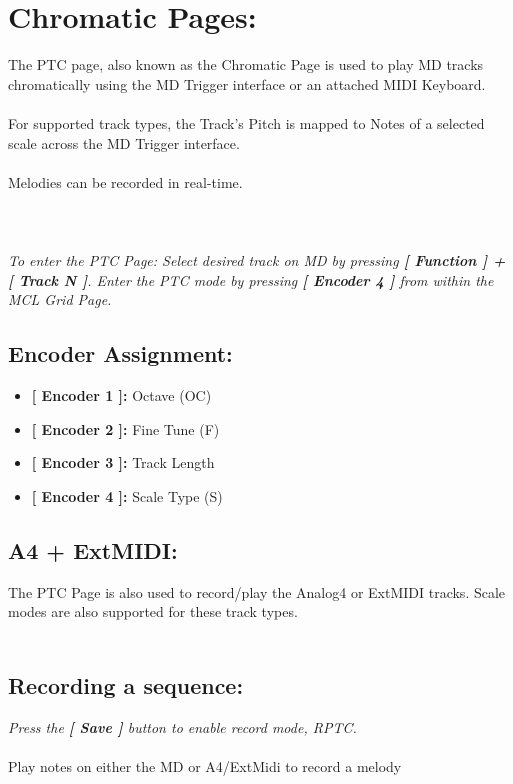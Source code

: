\chapter{Chromatic Pages:}
The PTC page, also known as the  Chromatic Page is used to play MD tracks chromatically using the MD Trigger interface or an attached MIDI Keyboard.\\
\\For supported track types, the Track’s Pitch is mapped to Notes of a selected scale across the MD Trigger interface.\\
\\Melodies can be recorded in real-time.\\
\\
\\\\
\textit{To enter the PTC Page: Select desired track on MD by pressing \textbf{[ Function ] + [ Track N ]}. Enter the PTC mode by pressing \textbf{[ Encoder 4 ] }from within the MCL Grid Page.}
\section{Encoder Assignment:}

	\begin{itemize}
		\item \textbf{[ Encoder 1 ]: } Octave (OC)
		\item \textbf{[ Encoder 2 ]: } Fine Tune (F)
		\item \textbf{[ Encoder 3 ]: } Track Length
		\item \textbf{[ Encoder 4 ]: } Scale Type (S)
	\end{itemize}
\section{A4 + ExtMIDI:}
The PTC Page is also used to record/play the Analog4 or ExtMIDI tracks. Scale modes are also supported for these track types.\\
\\
\section{Recording a sequence:}
\textit{Press the \textbf{[ Save ] }button to enable record mode, RPTC.\\}
\\Play notes on either the MD or A4/ExtMidi to record a melody
